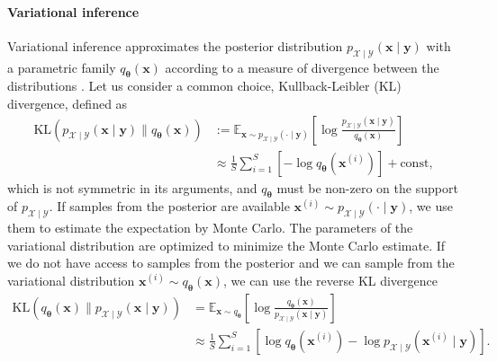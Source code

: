 \paragraph{Variational inference}
Variational inference approximates the posterior distribution $p_{\mathcal{X}\mid \mathcal{Y}}(\boldsymbol{x}\mid \boldsymbol{y})$ with a parametric family $q_{\boldsymbol{\theta}}(\boldsymbol{x})$ 
according to a measure of divergence between the distributions \citep{blei2017variational}.
Let us consider a common choice, Kullback-Leibler (KL) divergence, defined as 
\begin{equation*}
\begin{aligned}
    \mathrm{KL}(p_{\mathcal{X}\mid \mathcal{Y}}(\boldsymbol{x}\mid \boldsymbol{y})\|q_{\boldsymbol{\theta}}(\boldsymbol{x}))&:= \mathbb{E}_{\boldsymbol{x}\sim p_{\mathcal{X}\mid \mathcal{Y}}(\cdot\mid \boldsymbol{y})}\!\left[\log\frac{p_{\mathcal{X}\mid \mathcal{Y}}(\boldsymbol{x}\mid \boldsymbol{y})}{q_{\boldsymbol{\theta}}(\boldsymbol{x})}\right]    \\
    &\approx \frac{1}{S}\sum_{i=1}^{S}
    \left[
    -\log q_{\boldsymbol{\theta}}\!\left(\boldsymbol{x}^{(i)}\right)    
\right] + \text{const},
\end{aligned}
\end{equation*}
which is not symmetric in its arguments, and $q_{\boldsymbol{\theta}}$ must  be non-zero on the support of $p_{\mathcal{X}\mid \mathcal{Y}}$.
If samples from the posterior are available $\boldsymbol{x}^{(i)}\sim p_{\mathcal{X}\mid \mathcal{Y}}(\cdot\mid \boldsymbol{y})$, we use them to estimate the expectation by Monte Carlo. The parameters of the variational distribution are optimized to minimize the Monte Carlo estimate. If we do not have access to samples from the posterior and we can sample from the variational distribution $\boldsymbol{x}^{(i)}\sim q_{\boldsymbol{\theta}}(\boldsymbol{x})$, we can use the reverse KL divergence
\begin{equation*}
\begin{aligned}
\mathrm{KL}\!\left(q_{\boldsymbol{\theta}}(\boldsymbol{x})\|p_{\mathcal{X}\mid \mathcal{Y}}(\boldsymbol{x}\mid \boldsymbol{y})\right)
&= \mathbb{E}_{\boldsymbol{x}\sim q_{\boldsymbol{\theta}}}
\!\left[\log\frac{q_{\boldsymbol{\theta}}(\boldsymbol{x})}{p_{\mathcal{X}\mid \mathcal{Y}}(\boldsymbol{x}\mid \boldsymbol{y})}\right]
\\
&\approx \frac{1}{S}\sum_{i=1}^{S}
\left[
\log q_{\boldsymbol{\theta}}\!\left(\boldsymbol{x}^{(i)}\right)
-\log p_{\mathcal{X}\mid \mathcal{Y}}\!\left(\boldsymbol{x}^{(i)}\mid \boldsymbol{y}\right)
\right].
\end{aligned}
\end{equation*}
